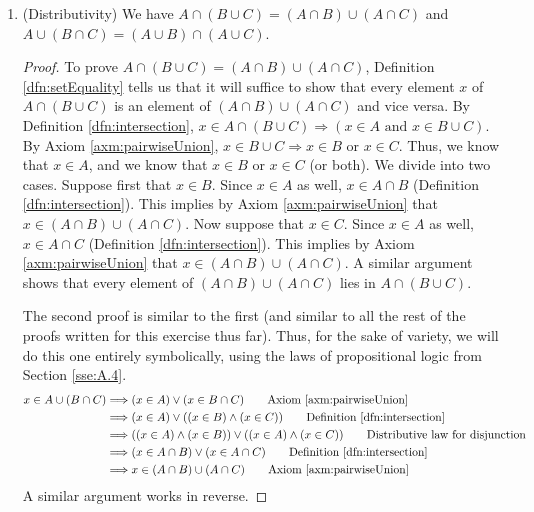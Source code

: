 \documentclass[../main.tex]{subfiles}
\begin{document}
\begin{enumerate}[ref={\thesection.\arabic*}]
\begin{prp}
\begin{enumerate}[label={\textup{(}\alph*\textup{)}},ref={\theenumi\alph*}]
\begin{proof}
            \end{proof}
            \item \label{exr:3.1.6f}(Distributivity) We have $A\cap(B\cup C)=(A\cap B)\cup(A\cap C)$ and $A\cup(B\cap C)=(A\cup B)\cap(A\cup C)$.
            \begin{proof}
                To prove $A\cap(B\cup C)=(A\cap B)\cup(A\cap C)$, Definition \ref{dfn:setEquality} tells us that it will suffice to show that every element $x$ of $A\cap(B\cup C)$ is an element of $(A\cap B)\cup(A\cap C)$ and vice versa. By Definition \ref{dfn:intersection}, $x\in A\cap(B\cup C) \Longrightarrow (x\in A\text{ and }x\in B\cup C)$. By Axiom \ref{axm:pairwiseUnion}, $x\in B\cup C \Longrightarrow x\in B\text{ or }x\in C$. Thus, we know that $x\in A$, and we know that $x\in B$ or $x\in C$ (or both). We divide into two cases. Suppose first that $x\in B$. Since $x\in A$ as well, $x\in A\cap B$ (Definition \ref{dfn:intersection}). This implies by Axiom \ref{axm:pairwiseUnion} that $x\in(A\cap B)\cup(A\cap C)$. Now suppose that $x\in C$. Since $x\in A$ as well, $x\in A\cap C$ (Definition \ref{dfn:intersection}). This implies by Axiom \ref{axm:pairwiseUnion} that $x\in(A\cap B)\cup(A\cap C)$. A similar argument shows that every element of $(A\cap B)\cup(A\cap C)$ lies in $A\cap(B\cup C)$.\par
                The second proof is similar to the first (and similar to all the rest of the proofs written for this exercise thus far). Thus, for the sake of variety, we will do this one entirely symbolically, using the laws of propositional logic from Section \ref{sse:A.4}.
                \begin{align*}
                    x\in A\cup(B\cap C) &\Longrightarrow (x\in A) \vee (x\in B\cap C)\tag*{Axiom \ref{axm:pairwiseUnion}}\\
                    &\Longrightarrow (x\in A) \vee ((x\in B) \wedge (x\in C))\tag*{Definition \ref{dfn:intersection}}\\
                    &\Longrightarrow ((x\in A) \wedge (x\in B)) \vee ((x\in A) \wedge (x\in C))\tag*{Distributive law for disjunction}\\
                    &\Longrightarrow (x\in A\cap B) \vee (x\in A\cap C)\tag*{Definition \ref{dfn:intersection}}\\
                    &\Longrightarrow x\in (A\cap B)\cup(A\cap C)\tag*{Axiom \ref{axm:pairwiseUnion}}
                \end{align*}
                A similar argument works in reverse.
            \end{proof}

\end{enumerate}
\end{prp}
\end{enumerate}
\end{document}
